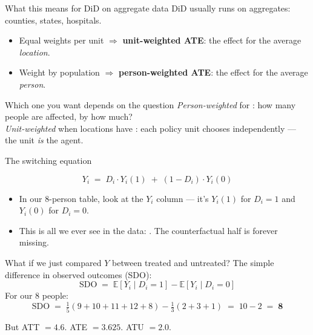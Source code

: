 \documentclass[aspectratio=169,11pt]{beamer}
\begin{document}
\begin{frame}{What this means for DiD on aggregate data}
DiD usually runs on aggregates: counties, states, hospitals.
\begin{itemize}\small
  \item Equal weights per unit $\Rightarrow$ \textbf{unit-weighted ATE}: the effect for the average \textit{location}.
  \item Weight by population $\Rightarrow$ \textbf{person-weighted ATE}: the effect for the average \textit{person}.
\end{itemize}
\vspace{0.3em}
\begin{block}{Which one you want depends on the question}
\small
\textit{Person-weighted} for : how many people are affected, by how much? \\[0.2em]
\textit{Unit-weighted} when locations have : each policy unit chooses independently --- the unit \textit{is} the agent.
\end{block}
\vspace{0.1em}
\end{frame}

\begin{frame}{The switching equation}
\vspace{1.2em}
\begin{center}
\Large
\[
Y_i \;=\; D_i \cdot Y_i(1) \;+\; (1 - D_i) \cdot Y_i(0)
\]
\end{center}
\vspace{1.2em}
\begin{itemize}\small
  \item In our 8-person table, look at the $Y_i$ column --- it's $Y_i(1)$ for $D_i=1$ and $Y_i(0)$ for $D_i=0$.
  \item This is all we ever see in the data: . The counterfactual half is forever missing.
\end{itemize}
\end{frame}

\begin{frame}{What if we just compared $Y$ between treated and untreated?}
\vspace{0.5em}
The simple difference in observed outcomes (SDO):
\vspace{0.5em}
\[
\text{SDO} \;=\; \mathbb{E}[Y_i \mid D_i = 1] - \mathbb{E}[Y_i \mid D_i = 0]
\]
\vspace{0.4em}
For our 8 people:
\[
\text{SDO} \;=\; \tfrac{1}{5}(9{+}10{+}11{+}12{+}8) - \tfrac{1}{3}(2{+}3{+}1) \;=\; 10 - 2 \;=\; \mathbf{8}
\]
\vspace{0.4em}
\begin{center}
But ATT $= 4.6$. ATE $= 3.625$. ATU $= 2.0$.\\[0.3em]
\end{center}
\end{frame}
\end{document}
